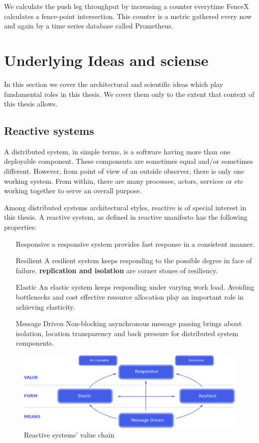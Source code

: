 \documentclass[a4]{report}
\begin{document}
    We calculate the push leg throughput by increasing a counter everytime FenceX calculates a fence-point intersection.
    This counter is a metric gathered every now and again by a time series database called Prometheus.

    \section{Underlying Ideas and sciense}
    In this section we cover the architectural and scientific ideas which play fundamental roles in this thesis.
    We cover them only to the extent that context of this thesis allows.

    \subsection{Reactive systems \cite{reactive-microsystems} \cite{reactive-manifesto}}
    A distributed system, in simple terms, is a software having more than one deployable component.
    These components are sometimes equal and/or sometimes different.
    However, from point of view of an outside observer, there is only one working system.
    From within, there are many processes, actors, services or etc working together to serve an overall purpose.

    Among distributed systems architectural styles, reactive is of special interest in this thesis.
    A reactive system, as defined in reactive manifesto \cite{reactive-manifesto} has the following properties:
    \begin{itemize}
        \item[Responsive] a responsive system provides fast response in a consistent manner.
        \item[Resilient] A resilient system keeps responding to the possible degree in face of failure.
        \textbf{replication and isolation} are corner stones of resiliency.
        \item[Elastic] An elastic system keeps responding under varying work load. Avoiding bottlenecks and cost
        effective resource allocation play an important role in achieving elasticity.
        \item[Message Driven] Non-blocking asynchronous message passing brings about isolation, location
        transparency and back pressure for distributed system components.
    \end{itemize}

    \begin{figure}[ht]
        \caption{Reactive systems' value chain}
        \label{fig:reactive-value}
        \includegraphics[scale=0.4]{images/reactive-traits.png}
    \end{figure}
\end{document}
